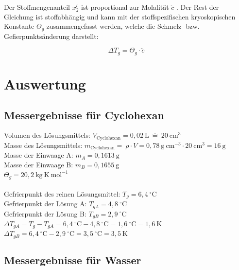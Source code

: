 \documentclass[12pt,a4paper,titlepage,headinclude,bibtotoc]{scrartcl}
\begin{document}
Der Stoffmengenanteil $x_2^l$ ist proportional zur Molalität $\check c$ . Der Rest der Gleichung ist stoffabhängig und kann mit der stoffspezifischen kryoskopischen Konstante $\Theta_g$ zusammengefasst werden, welche die Schmelz- bzw. Gefierpunktsänderung darstellt:

\begin{equation}
\Delta T_g = \Theta_g \cdot \check c
\end{equation}

\newpage
\section{Auswertung}

\subsection{Messergebnisse für Cyclohexan}

Volumen des Lösungsmittels: $V_{\mathrm{Cyclohexan}} = 0,02 {~} \mathrm{L}{~}\widehat{=}{~}20 {~}\mathrm{cm^3}$ \\
Masse des Lösungsmittels:  $m_{\mathrm{Cyclohexan}} = {~} \rho \cdot V = 0,78{~} \mathrm{g {~}cm^{-3}} \cdot 20{~} \mathrm{cm^{3}} = 16{~}\mathrm{g}$\\
Masse der Einwaage A: $m_A = 0,1613{~} \mathrm{g}$\\ 
Masse der Einwaage B: $m_B = 0,1655{~} \mathrm{g}$\\
$\Theta _g = 20,2 {~} \mathrm{kg{~}K {~} mol^{-1}}$\\\\
Gefrierpunkt des reinen Lösungsmittel: $ T_g = 6,4 {~}^{\circ}\text{C}$\\
Gefrierpunkt der Lösung A: $ T_{gA} = 4,8 {~}^{\circ}\text{C}$\\
Gefrierpunkt der Lösung B: $ T_{gB} = 2,9 {~}^{\circ}\text{C}$\\
$ \Delta T _{gA} = T_g - T _{gA} = 6,4 {~}^{\circ}\text{C} - 4,8 {~}^{\circ}\text{C} = 1,6 {~}^{\circ}\text{C} = 1,6{~}\mathrm{K} $\\
$ \Delta T _{gB} = 6,4 {~}^{\circ}\text{C} - 2,9 {~}^{\circ}\text{C} = 3,5 {~}^{\circ}\text{C} = 3,5 {~} \mathrm{K} $
\subsection{Messergebnisse für Wasser}
\end{document}
